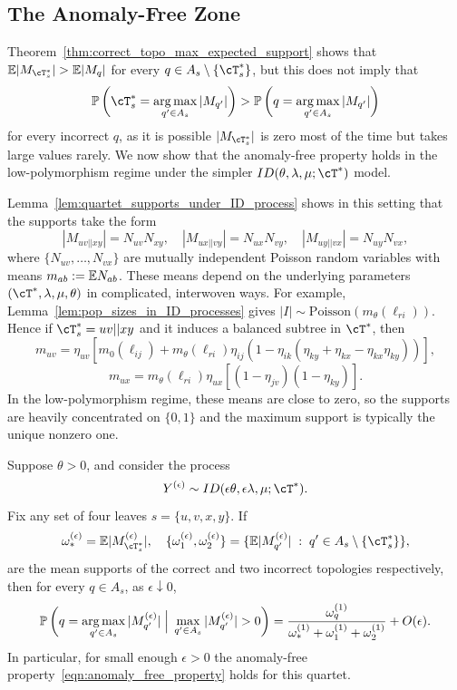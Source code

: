 \subsection{The Anomaly-Free Zone}
\label{sec:anomaly-free-zone}

Theorem~\ref{thm:correct_topo_max_expected_support} shows that $\E |M_{\cT_s^*}|>\E|M_q|$
for every $q\in A_s\setminus\{\cT_s^*\}$, but this does not imply that
%
\[\P\left(\cT_s^* = \argmax_{q' \in A_s} |M_{q'}|\right)
>\P\left(q = \argmax_{q' \in A_s} |M_{q'}|\right)\]
%
\noindent for every incorrect $q$, as it is possible $|M_{\cT_s^*}|$ is zero most of the time but takes large values
rarely. We now show that the anomaly-free property holds in the low-polymorphism regime
under the simpler $ID(\theta, \lambda, \mu; \cT^*)$ model.

Lemma~\ref{lem:quartet_supports_under_ID_process} shows in this setting that the supports take the form
%
\[|M_{uv||xy}| = N_{uv}N_{xy}, \quad |M_{ux||vy}| = N_{ux} N_{vy}, \quad |M_{uy||vx}| = N_{uy} N_{vx},\]
%
\noindent where $\{N_{uv},\ldots,N_{vx}\}$ are mutually independent Poisson random variables with means
$m_{ab}:=\mathbb{E} N_{ab}$. These means depend on the underlying parameters
$(\cT^*,\lambda,\mu,\theta)$ in complicated, interwoven ways. For example,
Lemma~\ref{lem:pop_sizes_in_ID_processes} gives $|I| \sim \mathrm{Poisson}(m_\theta(\ell_{ri}))$.
Hence if $\cT_s^*=uv||xy$ and it induces a balanced subtree in $\cT^*$, then
%
\[m_{uv} = \eta_{uv} \left[m_0(\ell_{ij}) + m_\theta(\ell_{ri}) \eta_{ij}(1 - \eta_{ik} (\eta_{ky} + \eta_{kx} - \eta_{kx} \eta_{ky}))\right],\]
\[m_{ux} = m_\theta(\ell_{ri})\eta_{ux} \left[(1-\eta_{jv}) (1-\eta_{ky})\right].\]
%
\noindent In the low-polymorphism regime, these means are close to zero, so the supports are heavily
concentrated on $\{0,1\}$ and the maximum support is typically the unique nonzero one.

\begin{lemma}
\label{lem:low_polymorphism_anomaly_free}
    Suppose $\theta>0$, and consider the process
    \[Y^{(\epsilon)}\sim ID(\epsilon\theta,\epsilon\lambda,\mu;\cT^*).\]
    Fix any set of four leaves $s=\{u,v,x,y\}$.
    If
    \[\omega_*^{(\epsilon)} = \E |M_{\cT_s^*}^{(\epsilon)}|, \quad \{ \omega_1^{(\epsilon)}, \omega_2^{(\epsilon)}\} = \{ \E|M_{q'}^{(\epsilon)}| \; :\; q' \in A_s \setminus \{\cT_s^*\}\},\]
    \noindent are the mean supports of the correct and two incorrect topologies respectively, then for every $q\in A_s$, as $\epsilon \downarrow 0$,
    \[\mathbb{P}\left(q = \operatorname*{arg\,max}_{q' \in A_s} |M^{(\epsilon)}_{q'}| \; \Big\vert \; \max_{q' \in A_s} |M^{(\epsilon)}_{q'}| > 0\right) = \frac{\omega_q^{(1)}}{\omega_*^{(1)} + \omega_1^{(1)} + \omega_2^{(1)}} + O(\epsilon).\]
    \noindent In particular, for small enough $\epsilon > 0$ the anomaly-free property~\eqref{eqn:anomaly_free_property} holds for this quartet.
\end{lemma}

